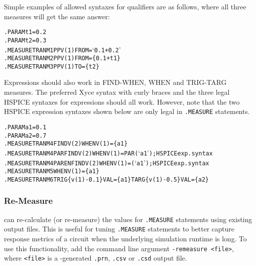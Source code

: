 Simple examples of allowed syntaxes for qualifiers are as follows, where
all three measures will get the same answer:
\begin{alltt}
.PARAM t1=0.2
.PARAM t2=0.3
.MEASURE TRAN M1 PP V(1) FROM=`0.1+0.2'
.MEASURE TRAN M2 PP V(1) FROM=\{0.1+t1\}
.MEASURE TRAN M3 PP V(1) TO=\{t2\}
\end{alltt}
Expressions should also work in FIND-WHEN, WHEN and TRIG-TARG measures. The
preferred Xyce syntax with curly braces and the three legal HSPICE syntaxes
for expressions should all work.  However, note that the two HSPICE
expression syntaxes shown below are only legal in \Xyce{} \texttt{.MEASURE}
statements.
\begin{alltt}
.PARAM a1=0.1
.PARAM a2=0.7
.MEASURE TRAN M4 FIND V(2) WHEN V(1)=\{a1\}
.MEASURE TRAN M4PAR FIND V(2) WHEN V(1)=PAR(`a1') ; HSPICE exp. syntax
.MEASURE TRAN M4PAREN FIND V(2) WHEN V(1)=(`a1')  ; HSPICE exp. syntax
.MEASURE TRAN M5 WHEN V(1)=\{a1\}
.MEASURE TRAN M6 TRIG \{v(1)-0.1\} VAL=\{a1\} TARG \{v(1)-0.5\} VAL=\{a2\}
\end{alltt}

\subsubsection{Re-Measure}
\label{Measure_ReMeasure}
\Xyce{} can re-calculate (or re-measure) the values for {\tt .MEASURE}
statements using existing \Xyce{} output files.  This is useful for
tuning {\tt .MEASURE} statements to better capture response metrics of
a circuit when the underlying simulation runtime is long.  To use this
functionality, add the command line argument {\tt -remeasure <file>},
where {\tt <file>} is a \Xyce{}-generated {\tt .prn}, {\tt .csv} or
{\tt .csd} output file.

